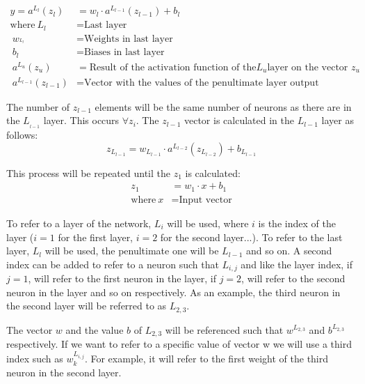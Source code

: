 \begin{equation}
    \begin{split}
    y = a^{L_l}(z_l) &= w_l \cdot a^{L_{l-1}}(z_{l-1}) + b_l \\ 
    \text{where}~L_l &= \text{Last layer} \\
  ~w_^{L_l} &= \text{Weights in last layer} \\ 
  ~b_l &= \text{Biases in last layer } \\
  ~a^{L_{u}}(z_{u}) &= \text{Result of the activation function of the} L_{u} \text{layer on the vector } z_u\\
  ~a^{L_{l-1}}(z_{l-1}) &= \text{Vector with the values of the penultimate layer output}
  \end{split}
  \label{eqn:layer3}
\end{equation}


The number of $z_{l-1}$ elements will be the same number of neurons as there are in the $L__{l-1}$ layer. This occurs $\forall z_i$. The $z_{l-1}$ vector is calculated in the $L_{l-1}$ layer as follows:
\begin{equation}
    z_{L_{l-1}} = w_{L_{l-1}} \cdot a^{L_{l-2}}(z_{L_{l-2}}) + b_{L_{l-1}}
  \label{eqn:layer2}
\end{equation}


This process will be repeated until the $z_1$ is calculated:
\begin{equation}
    \begin{split}
    z_1 &= w_1 \cdot x + b_1 \\
    \text{where}~x &= \text{Input vector}
  \end{split}
  \label{eqn:layer1}
\end{equation}

To refer to a layer of the network, $L_i$ will be used, where $i$ is the index of the layer ($i=1$ for the first layer, $i=2$ for the second layer...). To refer to the last layer, $L_l$ will be used, the penultimate one will be $L_{l-1}$ and so on. A second index can be added to refer to a neuron such that $L_{i,j}$ and like the layer index, if $j=1$, will refer to the first neuron in the layer, if $j=2$, will refer to the second neuron in the layer and so on respectively. As an example, the third neuron in the second layer will be referred to as $L_{2, 3}$.
\newline


The vector $w$ and the value $b$ of $L_{2, 3}$ will be referenced such that $w^{L_{2,3}}$ and $b^{L_{2,3}}$ respectively. If we want to refer to a specific value of vector w we will use a third index such as $w^{L_{i,j}}_k$. For example, it will refer to the first weight of the third neuron in the second layer.
\newline


